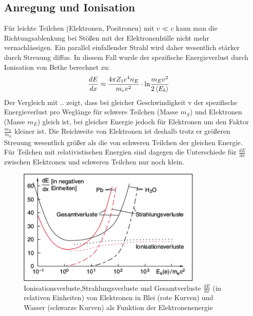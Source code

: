 \documentclass[Ex4_Zusammenfassung.tex]{subfiles}
\begin{document}
\subsection{Anregung und Ionisation}
Für leichte Teilchen (Elektronen, Positronen) mit $v \ll c$ kann man die Richtungsablenkung bei Stößen mit der Elektronenhülle nicht mehr vernachlässigen. Ein parallel einfallender Strahl wird daher wesentlich stärker durch Streuung diffus. In diesem Fall wurde der spezifische Energieverlust durch Ionisation von Bethe berechnet zu: 
\begin{equation}
\frac{dE}{dx} \approx \frac{4\pi Z_1 e^4 n_E }{m_e v^2} \cdot  \text{ln} \frac{m_E v^2}{2 \braket{E_b} }
\end{equation}
Der Vergleich mit .. zeigt, dass bei gleicher Geschwindigkeit v der spezifische Energieverlust pro Weglänge für schwere Teilchen (Masse $m_S$) und Elektronen (Masse $m_E$) gleich ist, bei gleicher Energie jedoch für Elektronen um den Faktor $\frac{m_E}{m_S} $ kleiner ist. Die Reichweite von Elektronen ist deshalb trotz er größeren Streuung wesentlich größer als die von schweren Teilchen der gleichen Energie. Für Teilchen mit relativistischen Energien sind dagegen die Unterschiede für $\frac{dE}{dx}$ zwischen Elektronen und schweren Teilchen nur noch klein. 
\begin{figure}[H]
\includegraphics[width=9cm]{Strahlungsverluste.png}
\caption{Ionisationsverluste,Strahlungsverluste und Gesamtverluste $ \frac{dE}{dx} $ \newline (in relativen Einheiten) von Elektronen in Blei (rote Kurven) und Wasser (schwarze Kurven) als Funktion der Elektronenenergie}
\end{figure} \newpage
\end{document}

